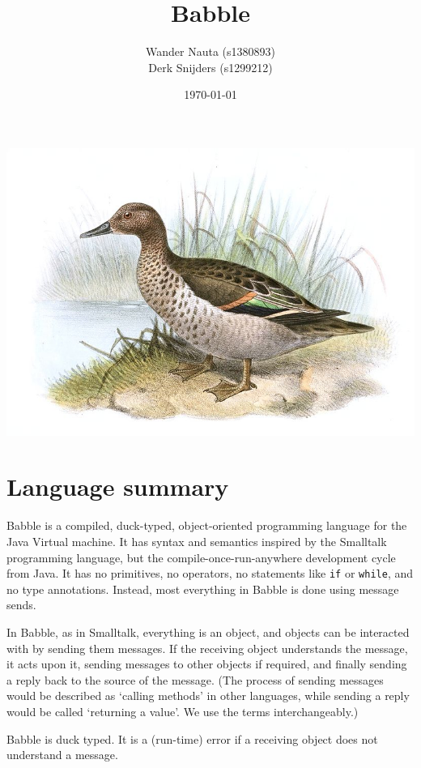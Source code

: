 \documentclass[a4paper]{article}
\begin{document}
\title{Babble}
\author{
Wander Nauta (s1380893)\\
Derk Snijders (s1299212)
}
\date{\today}

\begin{titlepage}
\includegraphics[width=\textwidth]{cover}
\vfill

{\Huge \thetitle}

\theauthor
\end{titlepage}

\tableofcontents

\section{Language summary}
Babble is a compiled, duck-typed, object-oriented programming language for the Java Virtual machine.
It has syntax and semantics inspired by the Smalltalk programming language, but the compile-once-run-anywhere development cycle from Java.
It has no primitives, no operators, no statements like \texttt{if} or \texttt{while}, and no type annotations.
Instead, most everything in Babble is done using message sends.

In Babble, as in Smalltalk, everything is an object, and objects can be interacted with by sending them messages.
If the receiving object understands the message, it acts upon it, sending messages to other objects if required, and finally sending a reply back to the source of the message.
(The process of sending messages would be described as `calling methods' in other languages, while sending a reply would be called `returning a value'.
We use the terms interchangeably.)

Babble is duck typed.
It is a (run-time) error if a receiving object does not understand a message.
\end{document}
